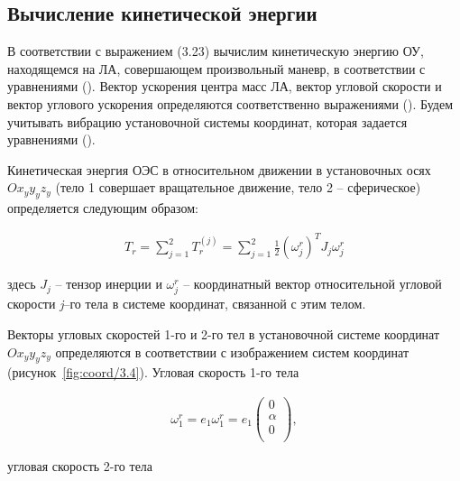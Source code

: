 \subsection{Вычисление кинетической энергии} \label{sec:ch3/sec6}

В соответствии с выражением (3.23) вычислим кинетическую энергию ОУ, находящемся на ЛА, совершающем произвольный маневр, в соответствии с уравнениями (). Вектор ускорения центра масс ЛА, вектор угловой скорости и вектор углового ускорения определяются соответственно выражениями (). Будем учитывать вибрацию установочной системы координат, которая задается уравнениями ().

Кинетическая энергия ОЭС в относительном движении в установочных осях  \( Ox_{y}y_{y}z_{y} \)  (тело 1 совершает вращательное движение, тело 2 – сферическое) определяется следующим образом:\par

\begin{equation}
\label{eq:p3:8}
\begin{alignedat}{2}
T_{r}= \sum_{j=1}^{2}T_{r}^{ \left( j \right) }= \sum_{j=1}^{2}\frac{1}{2} \left(  \omega_{j}^{r} \right) ^{T}J_{j} \omega_{j}^{r}
\end{alignedat}
\end{equation}

здесь  
\( J_{j} \) – тензор инерции и  
\(  \omega_{j}^{r} \) – координатный вектор относительной угловой скорости \textit{j}–го тела в системе координат, связанной с этим телом.\par


Векторы угловых скоростей 1-го и 2-го тел в установочной системе координат  \( Ox_{y}y_{y}z_{y} \)  определяются в соответствии с изображением систем координат (рисунок~\ref{fig:coord/3.4}). Угловая скорость 1-го тела \par

\begin{equation}
\label{eq:p3:9}
\begin{alignedat}{2}
\omega_{1}^{r}=e_{1} \omega_{1}^{r}=e_{1} \left( \begin{matrix}
0\\
\alpha \\
0\\
\end{matrix}
\right) ,
\end{alignedat}
\end{equation}

угловая скорость 2-го тела\par

